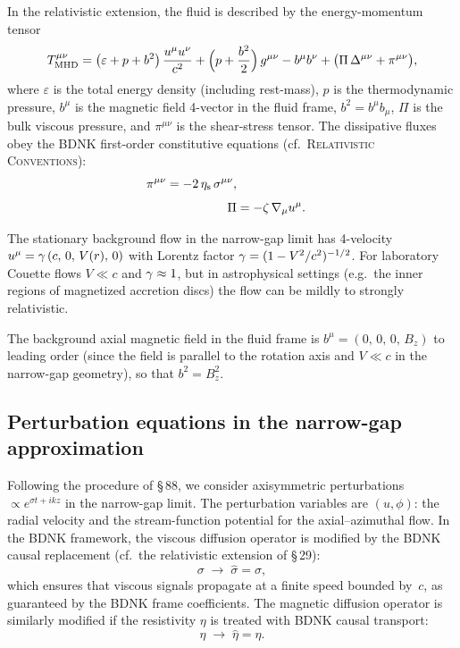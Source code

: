 In the relativistic extension, the fluid is described by the
energy-momentum tensor
\begin{equation}\label{eq:rel-9-Tmunu-mhd}
  T^{\mu\nu}_{\mathrm{MHD}} =
  \bigl(\varepsilon + p + b^{2}\bigr)\,\frac{u^{\mu}u^{\nu}}{c^{2}}
  + \Bigl(p + \frac{b^{2}}{2}\Bigr)\,g^{\mu\nu}
  - b^{\mu}b^{\nu}
  + \bigl(\Pi\,\Delta^{\mu\nu} + \pi^{\mu\nu}\bigr),
\end{equation}
where $\varepsilon$ is the total energy density (including rest-mass),
$p$ is the thermodynamic pressure, $b^{\mu}$ is the magnetic field
4-vector in the fluid frame, $b^{2} = b^{\mu}b_{\mu}$, $\Pi$ is the
bulk viscous pressure, and $\pi^{\mu\nu}$ is the shear-stress tensor.
The dissipative fluxes obey the BDNK first-order constitutive
equations (cf.\ \textsc{Relativistic Conventions}):
\begin{align}
  \pi^{\mu\nu}
  = -2\,\eta_{\mathrm{s}}\,\sigma^{\mu\nu},
  \label{eq:rel-9-IS-shear}\\[4pt]
  \Pi
  &= -\zeta\,\nabla_{\mu}u^{\mu}.
  \label{eq:rel-9-IS-bulk}
\end{align}

The stationary background flow in the narrow-gap limit has
4-velocity $u^{\mu} = \gamma\,(c,\,0,\,V(r),\,0)$ with Lorentz factor
$\gamma = (1 - V^{2}/c^{2})^{-1/2}$.  For laboratory Couette flows
$V \ll c$ and $\gamma \approx 1$, but in astrophysical settings (e.g.\
the inner regions of magnetized accretion discs) the flow can be
mildly to strongly relativistic.

The background axial magnetic field in the fluid frame is
$b^{\mu} = (0,\,0,\,0,\,B_{z})$ to leading order (since the field is
parallel to the rotation axis and $V \ll c$ in the narrow-gap
geometry), so that $b^{2} = B_{z}^{2}$.

\subsection{Perturbation equations in the narrow-gap approximation}

Following the procedure of \S\,88, we consider axisymmetric
perturbations $\propto e^{\sigma t + i k z}$ in the narrow-gap limit.
The perturbation variables are $(u, \phi)$: the radial velocity and
the stream-function potential for the axial--azimuthal flow.  In the
BDNK framework, the viscous diffusion operator is modified
by the BDNK causal replacement (cf.\ the relativistic extension of
\S\,29):
\begin{equation}\label{eq:rel-9-sigma-hat}
  \sigma \;\longrightarrow\; \hat{\sigma}
  = \sigma,
\end{equation}
which ensures that viscous signals propagate at a finite speed
bounded by~$c$, as guaranteed by the BDNK frame coefficients.
The magnetic diffusion operator is similarly modified if the
resistivity $\eta$ is treated with BDNK causal transport:
\begin{equation}\label{eq:rel-9-eta-hat}
  \eta \;\longrightarrow\; \hat{\eta}
  = \eta.
\end{equation}


